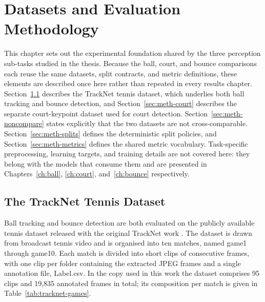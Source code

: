 \chapter{Datasets and Evaluation Methodology}
\label{ch:methodology}

This chapter sets out the experimental foundation shared by the three
perception sub-tasks studied in the thesis. Because the ball, court, and bounce
comparisons each reuse the same datasets, split contracts, and metric
definitions, these elements are described once here rather than repeated in
every results chapter. Section~\ref{sec:meth-tracknet} describes the TrackNet
tennis dataset, which underlies both ball tracking and bounce detection, and
Section~\ref{sec:meth-court} describes the separate court-keypoint dataset used
for court detection. Section~\ref{sec:meth-noncompare} states explicitly that
the two datasets are not cross-comparable. Section~\ref{sec:meth-splits} defines
the deterministic split policies, and Section~\ref{sec:meth-metrics} defines the
shared metric vocabulary. Task-specific preprocessing, learning targets, and
training details are not covered here: they belong with the models that consume
them and are presented in Chapters~\ref{ch:ball}, \ref{ch:court},
and~\ref{ch:bounce} respectively.

\section{The TrackNet Tennis Dataset}
\label{sec:meth-tracknet}

Ball tracking and bounce detection are both evaluated on the publicly available
tennis dataset released with the original TrackNet work
\cite{huang2019tracknet}. The dataset is drawn from broadcast tennis video and
is organised into ten matches, named game1 through game10.
Each match is divided into short clips of consecutive frames, with one clip per
folder containing the extracted JPEG frames and a single annotation file,
Label.csv. In the copy used in this work the dataset comprises 95 clips
and 19{,}835 annotated frames in total; its composition per match is given in
Table~\ref{tab:tracknet-games}.

